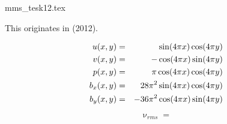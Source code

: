 \begin{flushright} {\tiny {\color{gray} mms\_tesk12.tex}} \end{flushright}

This originates in \textcite{teask12} (2012). 

\begin{eqnarray}
u(x,y) &=& \sin(4\pi x)\cos(4 \pi y) \nonumber\\
v(x,y) &=& -\cos(4\pi x)\sin(4 \pi y) \nonumber\\
p(x,y) &=& \pi \cos(4 \pi x) \cos(4 \pi y) \nonumber\\
b_x(x,y) &=& 28 \pi^2 \sin(4 \pi x) \cos(4 \pi y) \nonumber\\
b_y(x,y) &=& -36 \pi^2 \cos(4 \pi x) \sin(4 \pi y) 
\end{eqnarray}

\[
\upnu_{rms} = 
\]


